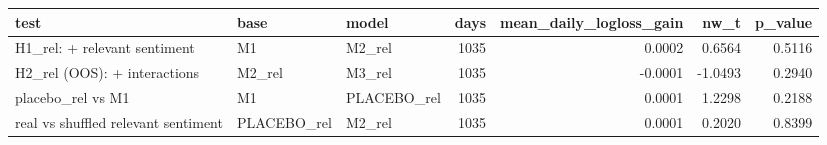 \begin{tabular}{lllrrrr}
\toprule
test & base & model & days & mean\_daily\_logloss\_gain & nw\_t & p\_value \\
\midrule
H1\_rel: + relevant sentiment & M1 & M2\_rel & 1035 & 0.0002 & 0.6564 & 0.5116 \\
H2\_rel (OOS): + interactions & M2\_rel & M3\_rel & 1035 & -0.0001 & -1.0493 & 0.2940 \\
placebo\_rel vs M1 & M1 & PLACEBO\_rel & 1035 & 0.0001 & 1.2298 & 0.2188 \\
real vs shuffled relevant sentiment & PLACEBO\_rel & M2\_rel & 1035 & 0.0001 & 0.2020 & 0.8399 \\
\bottomrule
\end{tabular}
